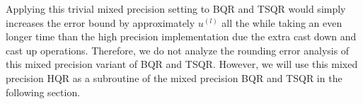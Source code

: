 \documentclass[review,onefignum,onetabnum]{siamart190516}
\newcommand{\F}{\mathbb{F}}
\newcommand{\bb}[1]{\mathbf{#1}}
\newcommand{\fl}{\mathrm{fl}}
\begin{document}
Applying this trivial mixed precision setting to BQR and TSQR would simply increases the error bound by approximately $u^{(l)}$ all the while taking an even longer time than the high precision implementation due the extra cast down and cast up operations.
Therefore, we do not analyze the rounding error analysis of this mixed precision variant of BQR and TSQR.
However, we will use this mixed precision HQR as a subroutine of the mixed precision BQR and TSQR in the following section. 
\end{document}

